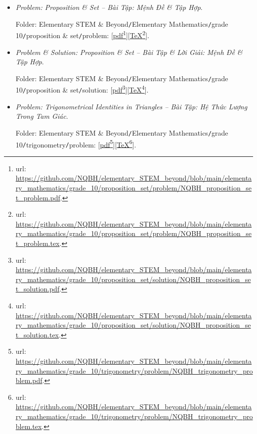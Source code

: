 \documentclass[12pt]{article}
\begin{document}
\begin{itemize}
	\item {\it Problem: Proposition \& Set -- Bài Tập: Mệnh Đề \& Tập Hợp}.
	
	Folder: {\sf Elementary STEM \& Beyond{\tt/}Elementary Mathematics{\tt/}grade 10{\tt/}proposition \& set{\tt/}problem}: [\href{https://github.com/NQBH/elementary_STEM_beyond/blob/main/elementary_mathematics/grade_10/proposition_set/problem/NQBH_proposition_set_problem.pdf}{pdf}\footnote{{\sc url}: \url{https://github.com/NQBH/elementary_STEM_beyond/blob/main/elementary_mathematics/grade_10/proposition_set/problem/NQBH_proposition_set_problem.pdf}.}][\href{https://github.com/NQBH/elementary_STEM_beyond/blob/main/elementary_mathematics/grade_10/proposition_set/problem/NQBH_proposition_set_problem.tex}{\TeX}\footnote{{\sc url}: \url{https://github.com/NQBH/elementary_STEM_beyond/blob/main/elementary_mathematics/grade_10/proposition_set/problem/NQBH_proposition_set_problem.tex}.}].
	
	\item {\it Problem \& Solution: Proposition \& Set -- Bài Tập \& Lời Giải: Mệnh Đề \& Tập Hợp}.
	
	Folder: {\sf Elementary STEM \& Beyond{\tt/}Elementary Mathematics{\tt/}grade 10{\tt/}proposition \& set{\tt/}solution}: [\href{https://github.com/NQBH/elementary_STEM_beyond/blob/main/elementary_mathematics/grade_10/proposition_set/solution/NQBH_proposition_set_solution.pdf}{pdf}\footnote{{\sc url}: \url{https://github.com/NQBH/elementary_STEM_beyond/blob/main/elementary_mathematics/grade_10/proposition_set/solution/NQBH_proposition_set_solution.pdf}.}][\href{https://github.com/NQBH/elementary_STEM_beyond/blob/main/elementary_mathematics/grade_10/proposition_set/solution/NQBH_proposition_set_solution.tex}{\TeX}\footnote{{\sc url}: \url{https://github.com/NQBH/elementary_STEM_beyond/blob/main/elementary_mathematics/grade_10/proposition_set/solution/NQBH_proposition_set_solution.tex}.}].
	
	\item {\it Problem: Trigonometrical Identities in Triangles -- Bài Tập: Hệ Thức Lượng Trong Tam Giác}.
	
	Folder: {\sf Elementary STEM \& Beyond{\tt/}Elementary Mathematics{\tt/}grade 10{\tt/}trigonometry{\tt/}problem}: [\href{https://github.com/NQBH/elementary_STEM_beyond/blob/main/elementary_mathematics/grade_10/trigonometry/problem/NQBH_trigonometry_problem.pdf}{pdf}\footnote{{\sc url}: \url{https://github.com/NQBH/elementary_STEM_beyond/blob/main/elementary_mathematics/grade_10/trigonometry/problem/NQBH_trigonometry_problem.pdf}.}][\href{https://github.com/NQBH/elementary_STEM_beyond/blob/main/elementary_mathematics/grade_10/trigonometry/problem/NQBH_trigonometry_problem.tex}{\TeX}\footnote{{\sc url}: \url{https://github.com/NQBH/elementary_STEM_beyond/blob/main/elementary_mathematics/grade_10/trigonometry/problem/NQBH_trigonometry_problem.tex}.}].
	

\end{itemize}
\end{document}
